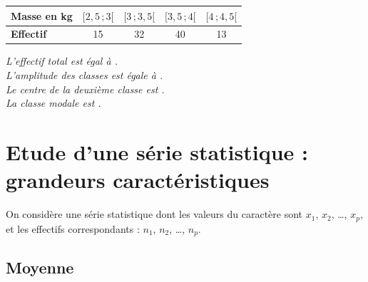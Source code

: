 \hspace{4.5em}
\begin{minipage}[t]{0.8\linewidth}
  \begin{tabular}[t]{|l|c|c|c|c|}
    \hline
    \textbf{Masse en kg} & $[2,\!5\,;3[$ & $[3\,;3,\!5[$ & $[3,\!5\,;4[$ &
    $[4\,;4,\!5[$ \\
    \hline
    \textbf{Effectif} & 15 & 32 & 40 & 13 \\
    \hline
  \end{tabular}
  \bigskip
  
  \textit{L'effectif total est égal à \comp.} \\[1ex]
  \textit{L'amplitude des classes est égale à \comp.} \\[1ex]
  \textit{Le centre de la deuxième classe est \comp.} \\[1ex]
  \textit{La classe modale est \comp.}

\end{minipage}











\clearpage



\renewcommand{\exe}[1]{\par %
  \noindent%
  \fontfamily{cmss}\selectfont Exemple : \  \normalfont%
  \begin{minipage}[t]{0.85\linewidth}%
    \textit{#1}%
  \end{minipage} \par%
  \medskip
}

\section{Etude d'une série statistique : grandeurs caractéristiques}

On considère une série statistique dont les valeurs du caractère sont
$x_1$, $x_2$, {\ldots}, $x_p$, et les effectifs correspondants :
$n_1$, $n_2$, {\ldots}, $n_p$.



\subsection{Moyenne}

